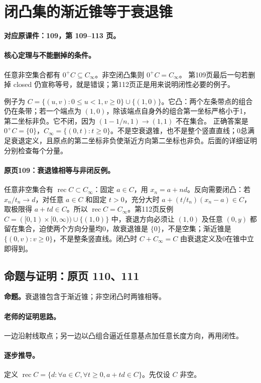 \clearpage\section{闭凸集的渐近锥等于衰退锥}\label{g:109:109}

\textbf{对应原课件：109，第 109--113 页。}


\paragraph{核心定理与不能删掉的条件。}
任意非空集合都有 $0^+C\subseteq C_\infty$。非空闭凸集则 $0^+C=C_\infty$。
第109页最后一句若删掉 closed 仍宣称等号，就是错误；第112页正是用来说明闭性必要的例子。

例子为 $C=\{(u,v):0\le u<1,v\ge0\}\cup\{(1,0)\}$。它凸：两个左条带点的组合仍在条带；若一个端点为 $(1,0)$，除该端点自身外的组合第一坐标严格小于1，第二坐标非负。它不闭，因为 $(1-1/n,1)\to(1,1)$ 不在集合。
正确答案是 $0^+C=\{0\}$，$C_\infty=\{(0,t):t\ge0\}$。不是空衰退锥，也不是整个竖直直线；0总满足衰退定义，且原点的第二坐标非负使渐近方向第二坐标也非负。后面的详细证明分别检查每个分量。


\paragraph{原页109：衰退锥相等与非闭反例。}任意非空集合有 $\operatorname{rec}C\subset C_\infty$：固定 $a\in C$，用 $x_n=a+nd$。反向需要闭凸：若 $x_n/t_n\to d$，对任意 $a\in C$ 和固定 $t>0$，充分大时 $a+(t/t_n)(x_n-a)\in C$，取极限得 $a+td\in C$。所以 $\operatorname{rec}C=C_\infty$。第112页反例 $C=([0,1)\times[0,\infty))\cup\{(1,0)\}$ 中，衰退方向必须让 $(1,0)$ 及任意 $(0,y)$ 都留在集合，迫使两个方向分量均0，故衰退锥是 $\{0\}$，不是空集；渐近锥是 $\{(0,v):v\ge0\}$，不是整条竖直线。闭凸时 $C+C_\infty=C$ 由衰退定义及0在锥中立即得到。



\subsection{命题与证明：原页 110、111}

\textbf{命题。}衰退锥包含于渐近锥；非空闭凸时两锥相等。

\paragraph{老师的证明思路。}一边沿射线取点；另一边以凸组合逼近任意基点加任意长度方向，再用闭性。

\paragraph{逐步推导。}
定义 $\operatorname{rec}C=\{d:\forall a\in C,\forall t\ge0,a+td\in C\}$。先仅设 $C$ 非空。
